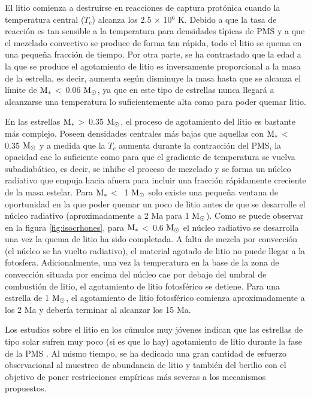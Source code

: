 El litio comienza a destruirse en reacciones de captura protónica cuando la temperatura central ($T_c$) alcanza los 2.5 × 10$^{6}$ K. Debido a que la tasa de reacción es tan sensible a la temperatura para densidades típicas de PMS \citep{Randich2006} y a que el mezclado convectivo se produce de forma tan rápida, todo el litio se quema en una pequeña fracción de tiempo. Por otra parte, se ha contrastado que la edad a la que se produce el agotamiento de litio es inversamente proporcional a la masa de la estrella, es decir, aumenta según disminuye la masa hasta que se alcanza el límite de $\mathrm{M}_*$ <\, 0.06 $\mathrm{M}_\odot$, ya que en este tipo de estrellas nunca llegará a alcanzarse una temperatura lo suficientemente alta como para poder quemar litio.\par

En las estrellas $\mathrm{M}_*$ >\, 0.35 $\mathrm{M}_\odot$, el proceso de agotamiento del litio es bastante más complejo. Poseen densidades centrales más bajas que aquellas con $\mathrm{M}_*$ <\, 0.35 $\mathrm{M}_\odot$ y a medida que la $T_c$ aumenta durante la contracción del PMS, la opacidad cae lo suficiente como para que el gradiente de temperatura se vuelva subadiabático, es decir, se inhibe el proceso de mezclado y se forma un núcleo radiativo que empuja hacia afuera para incluir una fracción rápidamente creciente de la masa estelar. Para $\mathrm{M}_*$ < \, 1 $\mathrm{M}_\odot$ solo existe una pequeña ventana de oportunidad en la que poder quemar un poco de litio antes de que se desarrolle el núcleo radiativo (aproximadamente a 2 Ma para 1 $\mathrm{M}_\odot$). Como se puede observar en la figura \ref{fig:isocrhones}, para $\mathrm{M}_*$ <\, 0.6 $\mathrm{M}_\odot$ el núcleo radiativo se desarrolla una vez la quema de litio ha sido completada. A falta de mezcla por convección (el núcleo se ha vuelto radiativo), el material agotado de litio no puede llegar a la fotosfera. Adicionalmente, una vez la temperatura en la base de la zona de convección situada por encima del núcleo cae por debajo del umbral de combustión de litio, el agotamiento de litio fotosférico se detiene. Para una estrella de  1 $\mathrm{M}_\odot$, el agotamiento de litio fotosférico comienza aproximadamente a los 2 Ma y debería terminar al alcanzar los 15 Ma.\par

Los estudios sobre el litio en los cúmulos muy jóvenes indican que las estrellas de tipo solar sufren muy poco (si es que lo hay) agotamiento de litio durante la fase de la PMS  \citep{Jeffries2004}. Al mismo tiempo, se ha dedicado una gran cantidad de esfuerzo observacional al muestreo de abundancia de litio y también del berilio \citep{Mena2011, DelgadoMena2014} con el objetivo de poner restricciones empíricas más severas a los mecanismos propuestos.\par

